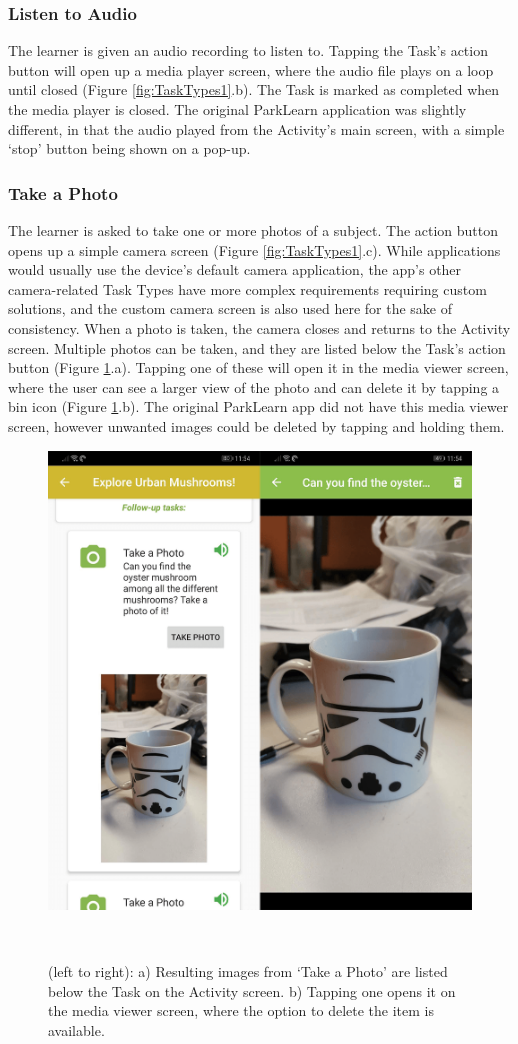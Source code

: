 \subsubsection*{Listen to Audio}
The learner is given an audio recording to listen to. Tapping the Task's action button will open up a media player screen, where the audio file plays on a loop until closed (Figure \ref{fig:TaskTypes1}.b). The Task is marked as completed when the media player is closed. The original ParkLearn application was slightly different, in that the audio played from the Activity's main screen, with a simple `stop' button being shown on a pop-up.
    
\subsubsection*{Take a Photo}
The learner is asked to take one or more photos of a subject. The action button opens up a simple camera screen (Figure \ref{fig:TaskTypes1}.c). While applications would usually use the device's default camera application, the app's other camera-related Task Types have more complex requirements requiring custom solutions, and the custom camera screen is also used here for the sake of consistency. When a photo is taken, the camera closes and returns to the Activity screen. Multiple photos can be taken, and they are listed below the Task's action button (Figure \ref{fig:MediaViewer}.a). Tapping one of these will open it in the media viewer screen, where the user can see a larger view of the photo and can delete it by tapping a bin icon (Figure \ref{fig:MediaViewer}.b). The original ParkLearn app did not have this media viewer screen, however unwanted images could be deleted by tapping and holding them.

\begin{figure}
  \centering
  \includegraphics[width=0.65\columnwidth]{images/chapter05/mediaViewer.png}
  \caption[OurPlace's media viewer]{(left to right): a) Resulting images from `Take a Photo' are listed below the Task on the Activity screen. b) Tapping one opens it on the media viewer screen, where the option to delete the item is available.}~\label{fig:MediaViewer}
\end{figure}

